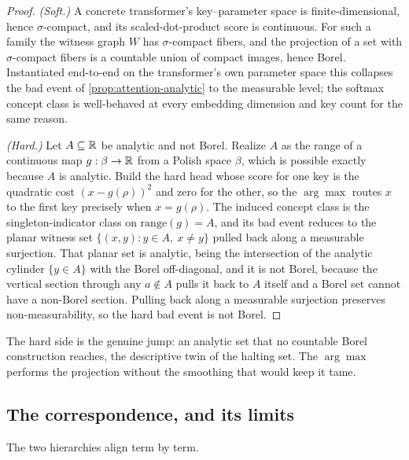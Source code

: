 \begin{proof}
\emph{(Soft.)} A concrete transformer's key--parameter space is finite-dimensional, hence $\sigma$-compact, and its scaled-dot-product score is continuous. For such a family the witness graph $W$ has $\sigma$-compact fibers, and the projection of a set with $\sigma$-compact fibers is a countable union of compact images, hence Borel. Instantiated end-to-end on the transformer's own parameter space this collapses the bad event of \cref{prop:attention-analytic} to the measurable level; the softmax concept class is well-behaved at every embedding dimension and key count for the same reason.

\emph{(Hard.)} Let $A\subseteq\mathbb{R}$ be analytic and not Borel. Realize $A$ as the range of a continuous map $g:\beta\to\mathbb{R}$ from a Polish space $\beta$, which is possible exactly because $A$ is analytic. Build the hard head whose score for one key is the quadratic cost $(x-g(\rho))^2$ and zero for the other, so the $\arg\max$ routes $x$ to the first key precisely when $x=g(\rho)$. The induced concept class is the singleton-indicator class on $\mathrm{range}(g)=A$, and its bad event reduces to the planar witness set $\{(x,y) : y\in A,\ x\neq y\}$ pulled back along a measurable surjection. That planar set is analytic, being the intersection of the analytic cylinder $\{y\in A\}$ with the Borel off-diagonal, and it is not Borel, because the vertical section through any $a\notin A$ pulls it back to $A$ itself and a Borel set cannot have a non-Borel section. Pulling back along a measurable surjection preserves non-measurability, so the hard bad event is not Borel.
\end{proof}

The hard side is the genuine jump: an analytic set that no countable Borel construction reaches, the descriptive twin of the halting set. The $\arg\max$ performs the projection without the smoothing that would keep it tame.

\subsection{The correspondence, and its limits}

The two hierarchies align term by term.

